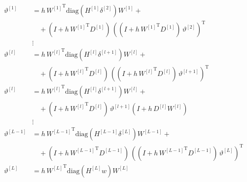 \begin{align*}
    \vartheta^{[1]} & = h \, {W^{[1]}}^{\mathrm{T}} \mathrm{diag} \left( H^{[1]} \delta^{[2]} \right) W^{[1]} + \\
    & \quad + \left( I + h \, {W^{[1]}}^{\mathrm{T}} D^{[1]} \right) \, \left( \left( I + h \, {W^{[1]}}^{\mathrm{T}} D^{[1]} \right) \, \vartheta^{[2]} \right)^{\mathrm{T}} \\ 
    &\vdots\\
    \vartheta^{[l]} & = h \, {W^{[l]}}^{\mathrm{T}} \mathrm{diag} \left( H^{[l]} \delta^{[l+1]} \right) W^{[l]} + \\
    & \quad + \left( I + h \, {W^{[l]}}^{\mathrm{T}} D^{[l]} \right) \, \left( \left( I + h \, {W^{[l]}}^{\mathrm{T}} D^{[l]} \right) \, \vartheta^{[l+1]} \right)^{\mathrm{T}} \\ 
    \vartheta^{[l]} & = h \, {W^{[l]}}^{\mathrm{T}} \mathrm{diag} \left( H^{[l]} \delta^{[l+1]} \right) W^{[l]} + \\
    & \quad + \left( I + h \, {W^{[l]}}^{\mathrm{T}} D^{[l]} \right) \, \vartheta^{[l+1]}  \left( I + h \,  D^{[l]} {W^{[l]}} \right) \\ 
    &\vdots\\
    \vartheta^{[L-1]} & = h \, {W^{[L-1]}}^{\mathrm{T}} \mathrm{diag} \left( H^{[L-1]} \delta^{[L]} \right) W^{[L-1]} + \\
    & \quad + \left( I + h \, {W^{[L-1]}}^{\mathrm{T}} D^{[L-1]} \right) \, \left( \left( I + h \, {W^{[L-1]}}^{\mathrm{T}} D^{[L-1]} \right) \, \vartheta^{[L]} \right)^{\mathrm{T}} \\
    \vartheta^{[L]} &  = h \, {W^{[L]}}^{\mathrm{T}} \mathrm{diag}(H^{[L]} w) W^{[L]} 
\end{align*}

